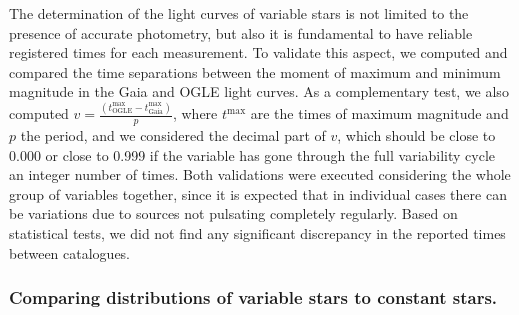 The determination of the light curves of variable stars is not limited to the presence of accurate photometry, but also it is fundamental to have reliable registered times for each measurement. To validate this aspect, we computed and compared the time separations between the moment of maximum and minimum magnitude in the Gaia and OGLE light curves. As a complementary test, we also computed $v = \frac{\left(t^{\mathrm{max}}_{\mathrm{OGLE}} - t^{\mathrm{max}}_{\mathrm{Gaia}} \right)}{p}$, where $t^{\mathrm{max}}$ are the times of maximum magnitude and $p$ the period, and we considered the decimal part of $v$, which should be close to 0.000 or close to 0.999 if the variable has gone through the full variability cycle an integer number of times. Both validations were executed considering the whole group of variables together, since it is expected that in individual cases there can be variations due to sources not pulsating completely regularly. Based on statistical tests, we did not find any significant discrepancy in the reported times between catalogues.

%
%
%


\subsubsection{Comparing distributions of variable stars to constant stars.}\label{chap:cu9val_var_dist}

